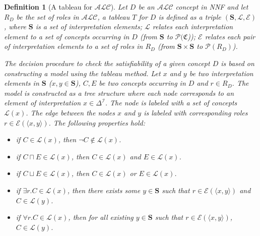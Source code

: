 \documentclass{article}
\newtheorem{mydef}{Definition}
\begin{document}
\begin{mydef}[A tableau for $\mathcal{ALC}$] \label{def:tableauALC}
Let $D$ be an $\mathcal{ALC}$ concept in NNF and let $R_D$ be the set of roles in $\mathcal{ALC}$, a tableau $T$ for $D$ is defined as a triple $(\mathbf{S},\mathcal{L}, \mathcal{E})$, 
where $\mathbf{S}$ is a set of interpretation elements;
$\mathcal{L}$ relates each interpretation element to a set of concepts occurring in $D$ (from $\mathbf{S}$ to $\mathcal{P}(\mathfrak{C}$)); 
$\mathcal{E}$ relates each pair of interpretation elements to a set of roles in $R_D$  (from $\mathbf{S}\times\mathbf{S}$ to $\mathcal{P}(R_D)$). 

The decision procedure to check the satisfiability of a given concept $D$ is based on constructing a model using the tableau method. 
Let $x$ and $y$ be two interpretation elements in $\mathbf{S}$ ($x,y\in \mathbf{S}$), $C,E$ be two concepts occurring in $D$ and $r\in R_D$.
The model is constructed as a tree structure where each node corresponds to an element of interpretation $x\in \Delta^\mathcal{I}$.
The node is labeled with a set of concepts $\mathcal{L}(x)$.
The edge between the nodes $x$ and $y$ is labeled with corresponding roles $r\in\mathcal{E}(\langle x,y \rangle)$.
The following properties hold:
\begin{itemize}
\item if $C\in \mathcal{L}(x)$, then $\neg C\notin\mathcal{L}(x)$.
\item if $C\sqcap E\in \mathcal{L}(x)$, then $ C\in\mathcal{L}(x)$ and $ E\in\mathcal{L}(x)$.
\item if $C\sqcup E\in \mathcal{L}(x)$, then $ C\in\mathcal{L}(x)$ or $ E\in\mathcal{L}(x)$.
\item if $\exists r.C\in \mathcal{L}(x)$, then there exists some $y\in \mathbf{S}$  such that $r \in \mathcal{E}(\langle x,y\rangle)$ and $C\in\mathcal{L}(y)$.
\item if $\forall r.C\in \mathcal{L}(x)$, then for all  existing $y \in \mathbf{S}$ such that $r \in \mathcal{E}(\langle x,y\rangle)$, $C\in\mathcal{L}(y)$.
\end{itemize}
\end{mydef}
\end{document}
